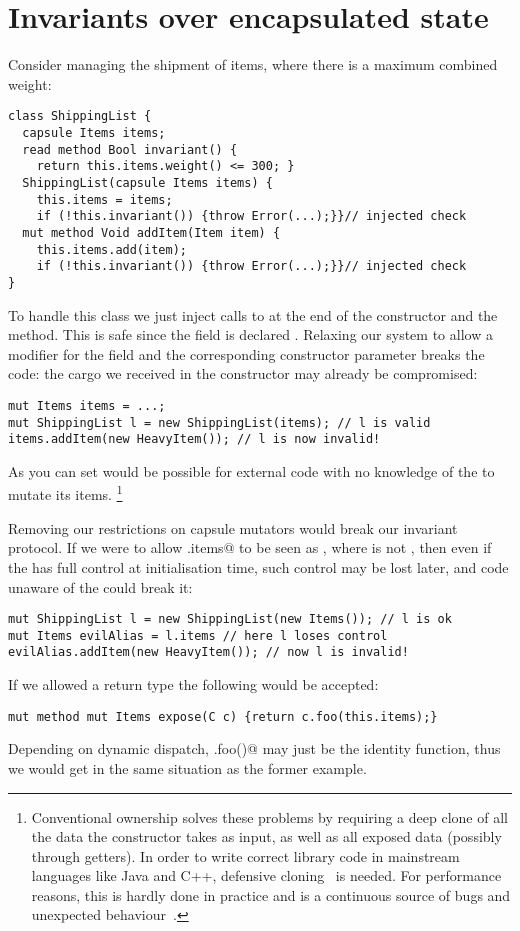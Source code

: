 \section{Invariants over encapsulated state}
\label{s:encapsulated}
Consider managing the shipment of items, where there is a maximum combined weight:
\begin{lstlisting}
class ShippingList {
  capsule Items items;
  read method Bool invariant() {
    return this.items.weight() <= 300; }
  ShippingList(capsule Items items) {
    this.items = items;
    if (!this.invariant()) {throw Error(...);}}// injected check
  mut method Void addItem(Item item) {
    this.items.add(item);
    if (!this.invariant()) {throw Error(...);}}// injected check
}
\end{lstlisting}

To handle this class we just inject calls to \Q@invariant@ at the end of the constructor and the \Q@addItem@ method.
This is safe since the \Q@items@ field is declared \Q@capsule@.
Relaxing our system to allow a \Q@mut@ modifier for
the \Q@items@ field and the corresponding constructor parameter 
breaks the code:
the cargo we received in the constructor may already be compromised:
\begin{lstlisting}
mut Items items = ...;
mut ShippingList l = new ShippingList(items); // l is valid
items.addItem(new HeavyItem()); // l is now invalid!
\end{lstlisting}

As you can set would be possible for external code with no knowledge of the \Q@ShippingList@ to mutate its items.%
\footnote{%
Conventional ownership solves these problems by requiring a deep clone of all the data the constructor takes as input, as well as all exposed data (possibly through getters).
In order to write correct library code in mainstream languages like Java and C++, defensive cloning~\cite{Bloch08} is needed.
For performance reasons, this is hardly done in practice and is a continuous source of bugs and unexpected behaviour~\cite{Bloch08}.}

Removing our restrictions on capsule mutators 
would break our invariant protocol.
If we were to allow \Q@x.items@ to be seen as \Q@mut@, where \Q@x@ is not \Q@this@, then  even if the \Q@ShippingList@ has full control at initialisation time, such control may be lost later, and code unaware of the \Q@ShippingList@ could break it:
\begin{lstlisting}
mut ShippingList l = new ShippingList(new Items()); // l is ok
mut Items evilAlias = l.items // here l loses control
evilAlias.addItem(new HeavyItem()); // now l is invalid!
\end{lstlisting}
If we allowed a \Q@mut@ return type the following would be accepted:
\begin{lstlisting}
mut method mut Items expose(C c) {return c.foo(this.items);}
\end{lstlisting}
Depending on dynamic dispatch, \Q@c.foo()@ may just be the identity function, thus
we would get in the same situation as the former example.


